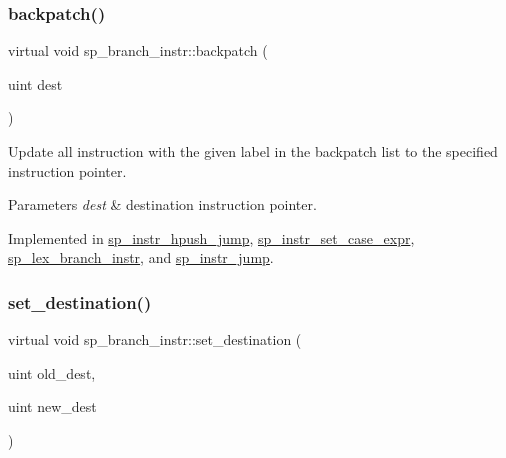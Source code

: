 \subsubsection{\texorpdfstring{backpatch()}{backpatch()}}
{\footnotesize\ttfamily virtual void sp\+\_\+branch\+\_\+instr\+::backpatch (\begin{DoxyParamCaption}\item[{uint}]{dest }\end{DoxyParamCaption})\hspace{0.3cm}{\ttfamily [pure virtual]}}

Update all instruction with the given label in the backpatch list to the specified instruction pointer.


\begin{DoxyParams}{Parameters}
{\em dest} & destination instruction pointer. \\
\hline
\end{DoxyParams}


Implemented in \mbox{\hyperlink{classsp__instr__hpush__jump_addad7cbed316eb02d7238e07e092c558}{sp\+\_\+instr\+\_\+hpush\+\_\+jump}}, \mbox{\hyperlink{classsp__instr__set__case__expr_a5d4c9c2460d84b449e5796186407b7b4}{sp\+\_\+instr\+\_\+set\+\_\+case\+\_\+expr}}, \mbox{\hyperlink{classsp__lex__branch__instr_a0a28016e4c51d49eb9ff014b0afa7703}{sp\+\_\+lex\+\_\+branch\+\_\+instr}}, and \mbox{\hyperlink{classsp__instr__jump_ad4ac1776111c39aa6d2af89b0ffe0af6}{sp\+\_\+instr\+\_\+jump}}.

\mbox{\label{classsp__branch__instr_ad5bc8e2fede785323c1749b6269869c3}} 
\subsubsection{\texorpdfstring{set\+\_\+destination()}{set\_destination()}}
{\footnotesize\ttfamily virtual void sp\+\_\+branch\+\_\+instr\+::set\+\_\+destination (\begin{DoxyParamCaption}\item[{uint}]{old\+\_\+dest,  }\item[{uint}]{new\+\_\+dest }\end{DoxyParamCaption})\hspace{0.3cm}{\ttfamily [pure virtual]}}

